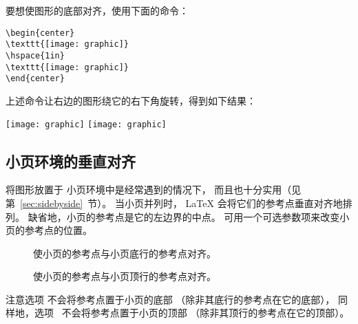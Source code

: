 要想使图形的底部对齐，使用下面的命令：
\begin{lstlisting}
\begin{center}
\texttt{[image: graphic]}
\hspace{1in}
\texttt{[image: graphic]}
\end{center}
\end{lstlisting}
上述命令让右边的图形绕它的右下角旋转，得到如下结果：
\begin{center}
	\texttt{[image: graphic]}
	\hspace{1in}
	\texttt{[image: graphic]}
\end{center}


\subsection{小页环境的垂直对齐}\label{ssec:minivalign}

将图形放置于  小页环境中是经常遇到的情况下，
而且也十分实用（见第~\ref{sec:sidebyside}~节）。
当小页并列时， \LaTeX{} 会将它们的参考点垂直对齐地排列。
缺省地，小页的参考点是它的左边界的中点。
可用一个可选参数项来改变小页的参考点的位置。
\begin{description}
	\item[\opt{[b]}] 使小页的参考点与小页底行的参考点对齐。
	\item[\opt{[t]}] 使小页的参考点与小页顶行的参考点对齐。
\end{description}

注意选项 \opt{[b]} 不会将参考点置于小页的底部
（除非其底行的参考点在它的底部），
同样地，选项 \opt{[t]}~不会将参考点置于小页的顶部
（除非其顶行的参考点在它的顶部）。

